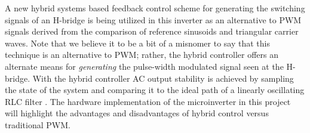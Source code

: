 A new hybrid systems based feedback control scheme for generating the switching signals of an H-bridge is being utilized in this inverter as an alternative to PWM signals derived from the comparison of reference sinusoids and triangular carrier waves. Note that we believe it to be a bit of a misnomer to say that this technique is an alternative to PWM; rather, the hybrid controller offers an alternate means for \emph{generating} the pulse-width modulated signal seen at the H-bridge. 
With the hybrid controller AC output stability is achieved by sampling the state of the system and comparing it to the ideal path of a linearly oscillating RLC filter \cite{ricardo}. The hardware implementation of the microinverter in this project will highlight the advantages and disadvantages of hybrid control versus traditional PWM.

